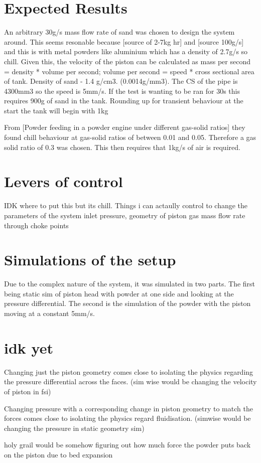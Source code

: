 \section{Expected Results}
An arbitrary 30g/s mass flow rate of sand was chosen to design the system around. This seems resonable because [source of 2-7kg hr] and [source 100g/s] and this is with metal powders like aluminium which has a density of 2.7g/s so chill.
Given this, the velocity of the piston can be calculated as mass per second = density * volume per second; volume per second = speed * cross sectional area of tank.
Density of sand - 1.4 g/cm3. (0.0014g/mm3). The CS of the pipe is 4300mm3 so the speed is 5mm/s. If the test is wanting to be ran for 30s this requires 900g of sand in the tank. Rounding up for transient behaviour at the start the tank will begin with 1kg

From [Powder feeding in a powder engine under different gas-solid ratios] they found chill behaviour at gas-solid ratios of between 0.01 and 0.05. Therefore a gas solid ratio of 0.3 was chosen. This then requires that 1kg/s of air is required.

\section{Levers of control}
IDK where to put this but its chill. Things i can actaully control to change the parameters of the system
inlet pressure,
geometry of piston
gas mass flow rate through choke points

\section{Simulations of the setup}
Due to the complex nature of the system, it was simulated in two parts. The first being static sim of piston head with powder at one side and looking at the pressure differential. The second is the simulation of the powder with the piston moving at a constant 5mm/s.



\section{idk yet}
Changing just the piston geometry comes close to isolating the physics regarding the pressure differential across the faces.
(sim wise would be changing the velocity of piston in fsi)

Changing pressure with a corresponding change in piston geometry to match the forces comes close to isolating the physics regard fluidisation.
(simwise would be changing the pressure in static geometry sim)

holy grail would be somehow figuring out how much force the powder puts back on the piston due to bed expansion